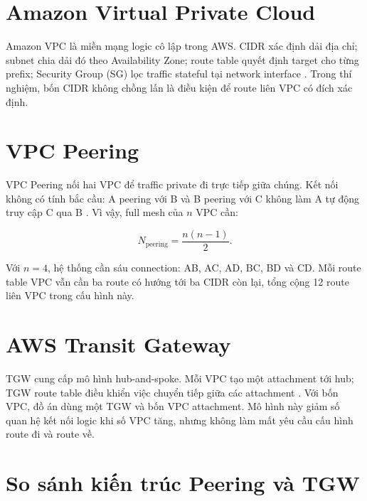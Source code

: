 \section{Amazon Virtual Private Cloud}

Amazon VPC là miền mạng logic cô lập trong AWS. CIDR xác định dải địa chỉ;
subnet chia dải đó theo Availability Zone; route table quyết định target cho
từng prefix; Security Group (SG) lọc traffic stateful tại network interface
\cite{aws-vpc-guide}. Trong thí nghiệm, bốn CIDR không chồng lấn là điều kiện
để route liên VPC có đích xác định.

\section{VPC Peering}

VPC Peering nối hai VPC để traffic private đi trực tiếp giữa chúng. Kết nối
không có tính bắc cầu: A peering với B và B peering với C không làm A tự động
truy cập C qua B \cite{aws-peering-guide}. Vì vậy, full mesh của $n$ VPC cần:

\begin{equation}
N_{\mathrm{peering}}=\frac{n(n-1)}{2}.
\end{equation}

Với $n=4$, hệ thống cần sáu connection: AB, AC, AD, BC, BD và CD. Mỗi route
table VPC vẫn cần ba route có hướng tới ba CIDR còn lại, tổng cộng 12 route
liên VPC trong cấu hình này.

\section{AWS Transit Gateway}

TGW cung cấp mô hình hub-and-spoke. Mỗi VPC tạo một attachment tới hub; TGW
route table điều khiển việc chuyển tiếp giữa các attachment
\cite{aws-tgw-overview,aws-tgw-routing}. Với bốn VPC, đồ án dùng một TGW và
bốn VPC attachment. Mô hình này giảm số quan hệ kết nối logic khi số VPC tăng,
nhưng không làm mất yêu cầu cấu hình route đi và route về.

\section{So sánh kiến trúc Peering và TGW}

